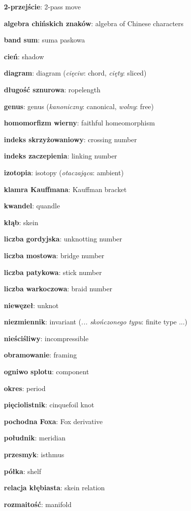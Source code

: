 \item \textbf{2-przejście}: 2-pass move
\item \textbf{algebra chińskich znaków}: algebra of Chinese characters
\item \textbf{band sum}: suma paskowa
\item \textbf{cień}: shadow
\item \textbf{diagram}: diagram
(\emph{cięciw}: chord, \emph{cięty}: sliced)
\item \textbf{długość sznurowa}: ropelength
\item \textbf{genus}: genus
(\emph{kanoniczny}: canonical, \emph{wolny}: free)
\item \textbf{homomorfizm wierny}: faithful homeomorphism
\item \textbf{indeks skrzyżowaniowy}: crossing number
\item \textbf{indeks zaczepienia}: linking number
\item \textbf{izotopia}: isotopy
(\emph{otaczająca}: ambient)
\item \textbf{klamra Kauffmana}: Kauffman bracket
\item \textbf{kwandel}: quandle
\item \textbf{kłąb}: skein
\item \textbf{liczba gordyjska}: unknotting number
\item \textbf{liczba mostowa}: bridge number
\item \textbf{liczba patykowa}: stick number
\item \textbf{liczba warkoczowa}: braid number
\item \textbf{niewęzeł}: unknot
\item \textbf{niezmiennik}: invariant
(\emph{... skończonego typu}: finite type ...)
\item \textbf{nieściśliwy}: incompressible
\item \textbf{obramowanie}: framing
\item \textbf{ogniwo splotu}: component
\item \textbf{okres}: period
\item \textbf{pięciolistnik}: cinquefoil knot
\item \textbf{pochodna Foxa}: Fox derivative
\item \textbf{południk}: meridian
\item \textbf{przesmyk}: isthmus
\item \textbf{półka}: shelf
\item \textbf{relacja kłębiasta}: skein relation
\item \textbf{rozmaitość}: manifold
